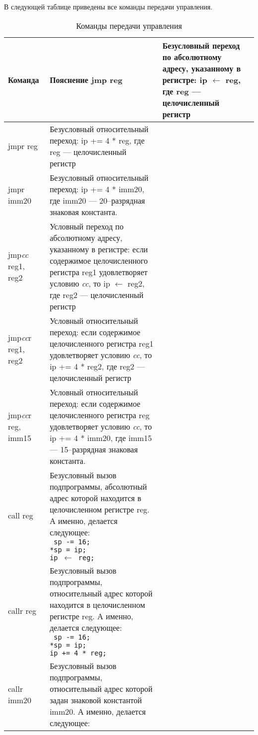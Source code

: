 \documentclass[10pt]{report}
\begin{document}
В следующей таблице приведены все команды передачи управления. 
\begin{longtable}[c]{|l|p{12.5cm}|}
\caption{Команды передачи управления} \\ \hline
{\textbf{Команда}}           & \textbf{Пояснение} \endhead \hline 
jmp reg                      & Безусловный переход по абсолютному адресу, указанному в регистре: ip $\leftarrow$ reg, где reg --- целочисленный регистр \\ \hline
jmpr reg                     & Безусловный относительный переход: ip += 4 * reg, где reg --- целочисленный регистр\\ \hline
jmpr imm20                   & Безусловный относительный переход: ip += 4 * imm20, где imm20 --- 20--разрядная знаковая константа. \\ \hline
jmp\textit{cc} reg1, reg2    & Условный переход по абсолютному адресу, указанному в регистре: если содержимое целочисленного регистра reg1 удовлетворяет условию \textit{cc}, то ip $\leftarrow$ reg2, где reg2 --- целочисленный регистр \\ \hline
jmp\textit{cc}r reg1, reg2   & Условный относительный переход: если содержимое целочисленного регистра reg1 удовлетворяет условию \textit{cc}, то ip += 4 * reg2, где reg2 --- целочисленный регистр\\ \hline
jmp\textit{cc}r reg, imm15   & Условный относительный переход: если содержимое целочисленного регистра reg удовлетворяет условию \textit{cc}, то ip += 4 * imm20, где imm15 --- 15--разрядная знаковая константа. \\ \hline
call reg                     & {\parbox{12.4cm}{Безусловный вызов подпрограммы, абсолютный адрес которой находится в целочисленном регистре reg. А именно, делается следующее:\\ %
\texttt{%
\phantom{aaaa}sp -= 16;\\
\phantom{aaaa}*sp = ip;\\
\phantom{aaaa}ip $\leftarrow$ reg;
}
}} \\ \hline
callr reg                     & {\parbox{12.4cm}{Безусловный вызов подпрограммы, относительный адрес которой находится в целочисленном регистре reg. А именно, делается следующее:\\ %
\texttt{%
\phantom{aaaa}sp -= 16;\\
\phantom{aaaa}*sp = ip;\\
\phantom{aaaa}ip += 4 * reg;
}
}} \\ \hline
callr imm20                   & {\parbox{12.4cm}{Безусловный вызов подпрограммы, относительный адрес которой задан знаковой константой imm20. А именно, делается следующее:\\ %
}}
\end{longtable}
\end{document}

